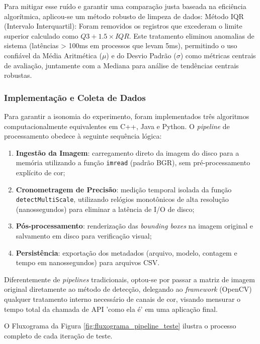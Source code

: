 Para mitigar esse ruído e garantir uma comparação justa baseada na eficiência algorítmica, aplicou-se um método robusto de limpeza de dados: Método IQR (Intervalo Interquartil): Foram removidos os registros que excederam o limite superior calculado como $Q3 + 1.5 \times IQR$. Este tratamento eliminou anomalias de sistema (latências > 100ms em processos que levam 5ms), permitindo o uso confiável da Média Aritmética ($\mu$) e do Desvio Padrão ($\sigma$) como métricas centrais de avaliação, juntamente com a Mediana para análise de tendências centrais robustas.

\subsubsection{Implementação e Coleta de Dados}
\label{sec:implementacao_coleta_dados}
Para garantir a isonomia do experimento, foram implementados três algoritmos computacionalmente equivalentes em C++, Java e Python. O \textit{pipeline} de processamento obedece à seguinte sequência lógica:

\begin{enumerate} 
    \item \textbf{Ingestão da Imagem}: carregamento direto da imagem do disco para a memória utilizando a função \texttt{imread} (padrão BGR), sem pré-processamento explícito de cor; 
    \item \textbf{Cronometragem de Precisão}: medição temporal isolada da função \texttt{detectMultiScale}, utilizando relógios monotônicos de alta resolução (nanossegundos) para eliminar a latência de I/O de disco;
    \item \textbf{Pós-processamento}: renderização das \textit{bounding boxes} na imagem original e salvamento em disco para verificação visual; 
    \item \textbf{Persistência}: exportação dos metadados (arquivo, modelo, contagem e tempo em nanossegundos) para arquivos CSV.
\end{enumerate}

Diferentemente de \textit{pipelines} tradicionais, optou-se por passar a matriz de imagem original diretamente ao método de detecção, delegando ao \textit{framework} (OpenCV) qualquer tratamento interno necessário de canais de cor, visando mensurar o tempo total da chamada de API 'como ela é' em uma aplicação final.

O Fluxograma da Figura \ref{fig:fluxograma_pipeline_teste} ilustra o processo completo de cada iteração de teste.

